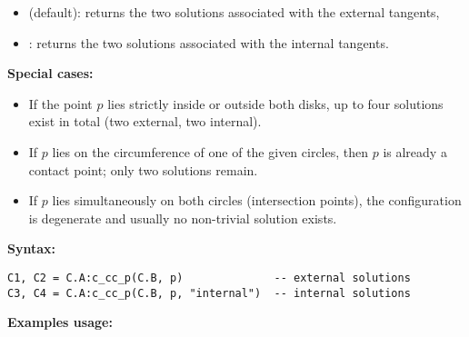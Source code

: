 \begin{itemize}
  \item {} (default): returns the two solutions associated with the external tangents,
  \item {}: returns the two solutions associated with the internal tangents.
\end{itemize}


\medskip
\noindent
\textbf{Special cases:}
\begin{itemize}
  \item If the point $p$ lies strictly inside or outside both disks, up to four solutions exist in total (two external, two internal).
  \item If $p$ lies on the circumference of one of the given circles, then $p$ is already a contact point; only two solutions remain.
  \item If $p$ lies simultaneously on both circles (intersection points), the configuration is degenerate and usually no non-trivial solution exists.
\end{itemize}

\medskip
\noindent
\textbf{Syntax:}

\begin{verbatim}
C1, C2 = C.A:c_cc_p(C.B, p)              -- external solutions
C3, C4 = C.A:c_cc_p(C.B, p, "internal")  -- internal solutions
\end{verbatim}

\medskip
\noindent
\textbf{Examples usage:}


\begin{tkzexample}[latex=.5\textwidth]
\begin{center}
\end{center}
\end{tkzexample}


